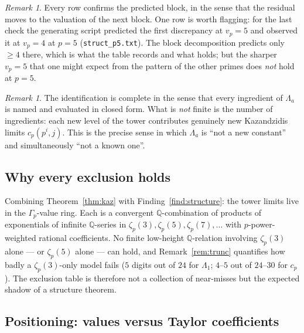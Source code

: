\documentclass[11pt,reqno]{article}
\newcommand{\QQ}{\mathbb{Q}}
\newcommand{\Gp}{\Gamma_p}
\newcommand{\vp}{v_p}
\theoremstyle{plain}
\theoremstyle{definition}
\theoremstyle{remark}
\newtheorem{remark}[theorem]{Remark}
\numberwithin{equation}{section}
\begin{document}
\begin{remark}
Every row confirms the predicted block, in the sense that the residual moves to the valuation of
the next block.  One row is worth flagging: for the last check the generating script predicted
the first discrepancy at $\vp=5$ and observed it at $\vp=4$ at $p=5$
(\texttt{struct\_p5.txt}).  The block decomposition predicts only $\ge4$ there, which is what
the table records and what holds; but the sharper $\vp=5$ that one might expect from the
pattern of the other primes does \emph{not} hold at $p=5$.
\end{remark}

\begin{remark}\label{rem:complete-not-finite}
The identification is complete in the sense that every ingredient of
$\Lambda_a$ is named and evaluated in closed form.  What is \emph{not} finite is
the number of ingredients: each new level of the tower contributes genuinely new
Kazandzidis limits $c_p(p^i,j)$.  This is the precise sense in which
$\Lambda_a$ is ``not a new constant'' and simultaneously ``not a known one''.
\end{remark}

\subsection{Why every exclusion holds}\label{ss:whyexcl}

Combining Theorem~\ref{thm:kaz} with Finding~\ref{find:structure}: the tower
limits live in the $\Gp$-value ring.  Each is a convergent $\QQ$-combination of
products of exponentials of infinite $\QQ$-series in
$\zeta_p(3),\zeta_p(5),\zeta_p(7),\dots$ with $p$-power-weighted rational
coefficients.  No finite low-height $\QQ$-relation involving $\zeta_p(3)$ alone
--- or $\zeta_p(5)$ alone --- can hold, and Remark~\ref{rem:trunc} quantifies
how badly a $\zeta_p(3)$-only model fails ($5$ digits out of $24$ for
$\Lambda_1$; $4$--$5$ out of $24$--$30$ for $c_p$).  The exclusion table is
therefore not a collection of near-misses but the expected shadow of a
structure theorem.

\subsection{Positioning: values versus Taylor coefficients}\label{ss:BVposition}
\end{document}
